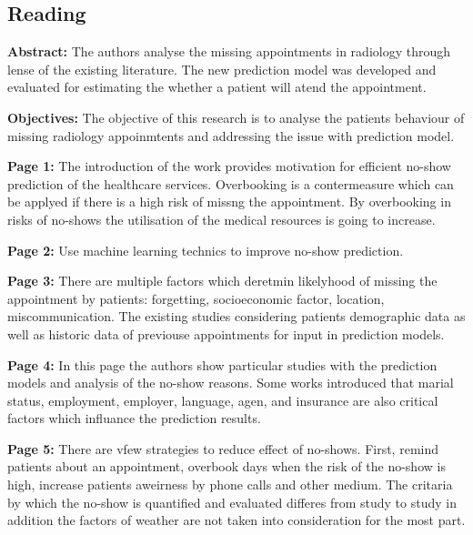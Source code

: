 \subsection{Reading}

    \textbf{Abstract:}
    The authors analyse the missing appointments in radiology through lense of the existing literature. The new prediction model was developed and evaluated for estimating the whether a patient will atend the appointment.

    \textbf{Objectives:}
    The objective of this research is to analyse the patients behaviour of missing radiology appoinmtents and addressing the issue with prediction model.

    \textbf{Page 1:}
    The introduction of the work provides motivation for efficient no-show prediction of the healthcare services. Overbooking is a contermeasure which can be applyed if there is a high risk of missng the appointment. By overbooking in risks of no-shows the utilisation of the medical resources is going to increase.

    \textbf{Page 2:}
    Use machine learning technics to improve no-show prediction.
    
    \textbf{Page 3:}
    There are multiple factors which deretmin likelyhood of missing the appointment by patients: forgetting, socioeconomic factor, location, miscommunication. The existing studies considering patients demographic data as well as historic data of previouse appointments for input in prediction models.
    
    \textbf{Page 4:}
    In this page the authors show particular studies with the prediction models and analysis of the no-show reasons. Some works introduced that marial status, employment, employer, language, agen, and insurance are also critical factors which influance the prediction results.
    
    \textbf{Page 5:}
    There are vfew strategies to reduce effect of no-shows. First, remind patients about an appointment, overbook days when the risk of the no-show is high, increase patients aweirness by phone calls and other medium. The critaria by which the no-show is quantified and evaluated differes from study to study in addition the factors of weather are not taken into consideration for the most part.

